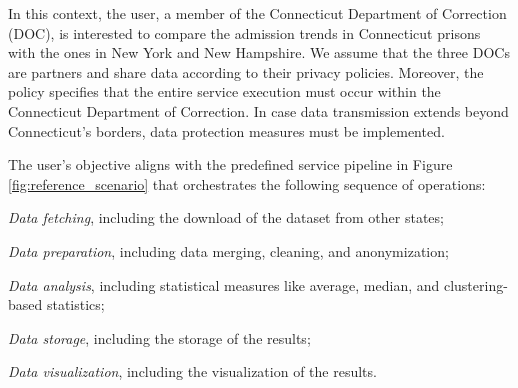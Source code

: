 In this context, the user, a member of the Connecticut Department of Correction (DOC), is interested to compare the admission trends in Connecticut prisons with the ones in New York and New Hampshire. We assume that the three DOCs are partners and share data according to their privacy policies. Moreover, the policy specifies that the entire service execution must occur within the Connecticut Department of Correction. In case data transmission extends beyond Connecticut's borders, data protection measures must be implemented.

The user's objective aligns with the predefined service pipeline in Figure \ref{fig:reference_scenario} that orchestrates the following sequence of operations:
\begin{enumerate*}[label=(\roman*)]
  \item \emph{Data fetching}, including the download of the dataset from other states;
  \item \emph{Data preparation}, including data merging, cleaning, and anonymization;
  \item \emph{Data analysis}, including statistical measures like average, median, and clustering-based statistics;
  \item \emph{Data storage}, including the storage of the results;
  \item \emph{Data visualization}, including the visualization of the results.
\end{enumerate*}

